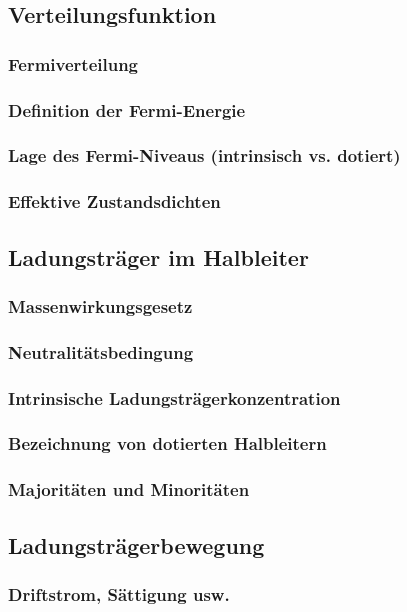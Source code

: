 \subsection{Verteilungsfunktion}
	\subsubsection{Fermiverteilung}
	\subsubsection{Definition der Fermi-Energie}	
	\subsubsection{Lage des Fermi-Niveaus (intrinsisch vs. dotiert)}
	\subsubsection{Effektive Zustandsdichten}	
\subsection{Ladungsträger im Halbleiter}
	\subsubsection{Massenwirkungsgesetz}
	\subsubsection{Neutralitätsbedingung}
	\subsubsection{Intrinsische Ladungsträgerkonzentration}
	\subsubsection{Bezeichnung von dotierten Halbleitern}
	\subsubsection{Majoritäten und Minoritäten}
\subsection{Ladungsträgerbewegung}
	\subsubsection{Driftstrom, Sättigung usw.}
